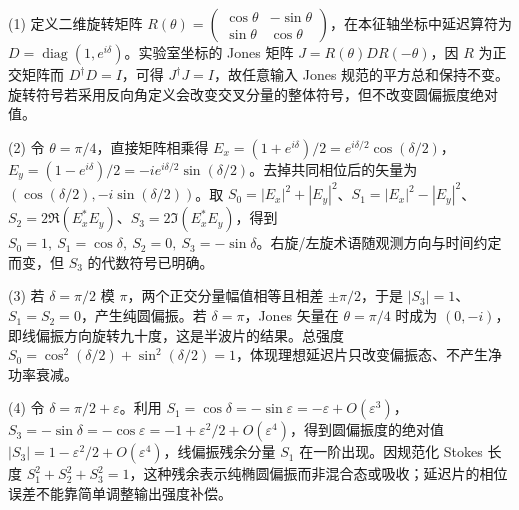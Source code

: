 (1) 定义二维旋转矩阵 \(R(\theta)=\begin{pmatrix}\cos\theta&-\sin\theta\\\sin\theta&\cos\theta\end{pmatrix}\)，在本征轴坐标中延迟算符为 \(D=\operatorname{diag}(1,e^{i\delta})\)。实验室坐标的 Jones 矩阵 \(J=R(\theta)D R(-\theta)\)，因 \(R\) 为正交矩阵而 \(D^\dagger D=I\)，可得 \(J^\dagger J=I\)，故任意输入 Jones 规范的平方总和保持不变。旋转符号若采用反向角定义会改变交叉分量的整体符号，但不改变圆偏振度绝对值。

(2) 令 \(\theta=\pi/4\)，直接矩阵相乘得 \(E_x=(1+e^{i\delta})/2=e^{i\delta/2}\cos(\delta/2)\)，\(E_y=(1-e^{i\delta})/2=-ie^{i\delta/2}\sin(\delta/2)\)。去掉共同相位后的矢量为 \((\cos(\delta/2),-i\sin(\delta/2))\)。取 \(S_0=|E_x|^2+|E_y|^2\)、\(S_1=|E_x|^2-|E_y|^2\)、\(S_2=2\Re(E_x^*E_y)\)、\(S_3=2\Im(E_x^*E_y)\)，得到 \(S_0=1,\ S_1=\cos\delta,\ S_2=0,\ S_3=-\sin\delta\)。右旋/左旋术语随观测方向与时间约定而变，但 \(S_3\) 的代数符号已明确。

(3) 若 \(\delta=\pi/2\) 模 \(\pi\)，两个正交分量幅值相等且相差 \(\pm\pi/2\)，于是 \(|S_3|=1\)、\(S_1=S_2=0\)，产生纯圆偏振。若 \(\delta=\pi\)，Jones 矢量在 \(\theta=\pi/4\) 时成为 \((0,-i)\)，即线偏振方向旋转九十度，这是半波片的结果。总强度 \(S_0=\cos^2(\delta/2)+\sin^2(\delta/2)=1\)，体现理想延迟片只改变偏振态、不产生净功率衰减。

(4) 令 \(\delta=\pi/2+\varepsilon\)。利用 \(S_1=\cos\delta=-\sin\varepsilon=-\varepsilon+O(\varepsilon^3)\)，\(S_3=-\sin\delta=-\cos\varepsilon=-1+\varepsilon^2/2+O(\varepsilon^4)\)，得到圆偏振度的绝对值 \(|S_3|=1-\varepsilon^2/2+O(\varepsilon^4)\)，线偏振残余分量 \(S_1\) 在一阶出现。因规范化 Stokes 长度 \(S_1^2+S_2^2+S_3^2=1\)，这种残余表示纯椭圆偏振而非混合态或吸收；延迟片的相位误差不能靠简单调整输出强度补偿。
